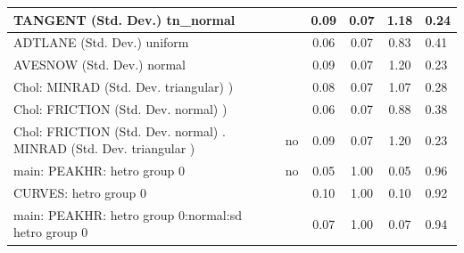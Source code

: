 \begin{table}
\begin{center}
\begin{tabular}{|l|l|c|c|c|l|}
			\hline
			TANGENT (Std. Dev.) tn_normal &  & 0.09 & 0.07 & 1.18 & 0.24 \\
			\hline
			ADTLANE (Std. Dev.) uniform &  & 0.06 & 0.07 & 0.83 & 0.41 \\
			\hline
			AVESNOW (Std. Dev.) normal &  & 0.09 & 0.07 & 1.20 & 0.23 \\
			\hline
			 Chol: MINRAD (Std. Dev. triangular) ) &  & 0.08 & 0.07 & 1.07 & 0.28 \\
			\hline
			 Chol: FRICTION (Std. Dev. normal) ) &  & 0.06 & 0.07 & 0.88 & 0.38 \\
			\hline
			 Chol: FRICTION (Std. Dev. normal) . MINRAD (Std. Dev.   triangular ) & no & 0.09 & 0.07 & 1.20 & 0.23 \\
			\hline
			main: PEAKHR: hetro group 0 & no & 0.05 & 1.00 & 0.05 & 0.96 \\
			\hline
			CURVES: hetro group 0 &  & 0.10 & 1.00 & 0.10 & 0.92 \\
			\hline
			main: PEAKHR: hetro group 0:normal:sd  hetro group 0 &  & 0.07 & 1.00 & 0.07 & 0.94 \\
			\hline
		\end{tabular}
	\end{center}
\end{table}